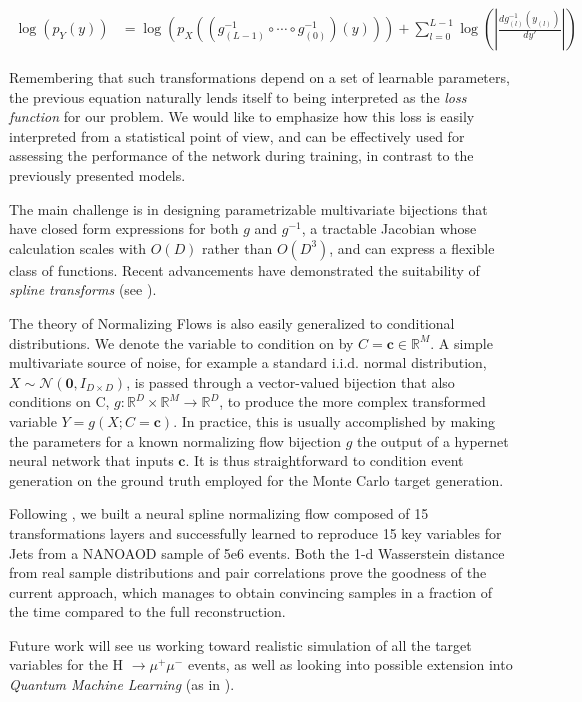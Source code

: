 \documentclass{scrartcl} %
\begin{document}
	\begin{equation*}
		\begin{aligned}
			\log(p_Y(y)) &= \log\left(p_X\left(\left(g_{(L-1)}^{-1}\circ\cdots\circ g_{(0)}^{-1}\right)\left(y\right)\right)\right)+\sum^{L-1}_{l=0}\log\left(\left|\frac{dg^{-1}_{(l)}(y_{(l)})}{dy'}\right|\right)
		\end{aligned}
	\end{equation*}
	
	Remembering that such transformations depend on a set of learnable parameters, the previous equation naturally lends itself to being interpreted as the \emph{loss function} for our problem. We would like to emphasize how this loss is easily interpreted from a statistical point of view, and can be effectively used for assessing the performance of the network during training, in contrast to the previously presented models.
	
	The main challenge is in designing parametrizable multivariate bijections that have closed form expressions for both $g$ and $g^{-1}$, a tractable Jacobian whose calculation scales with $O(D)$ rather than $O(D^3)$, and can express a flexible class of functions. Recent advancements have demonstrated the suitability of \emph{spline transforms} (see \cite{durkan}).
	
	The theory of Normalizing Flows is also easily generalized to conditional distributions. We denote the variable to condition on by $C=\mathbf{c}\in\mathbb{R}^M$. A simple multivariate source of noise, for example a standard i.i.d. normal distribution, $X\sim\mathcal{N}(\mathbf{0},I_{D\times D})$, is passed through a vector-valued bijection that also conditions on C, $g:\mathbb{R}^D\times\mathbb{R}^M\rightarrow\mathbb{R}^D$, to produce the more complex transformed variable $Y=g(X;C=\mathbf{c})$. In practice, this is usually accomplished by making the parameters for a known normalizing flow bijection $g$ the output of a hypernet neural network that inputs $\mathbf{c}$. It is thus straightforward to condition event generation on the ground truth employed for the Monte Carlo target generation.
	
	Following \cite{green2020complete}, we built a  neural spline normalizing flow composed of 15 transformations layers and successfully learned to reproduce 15 key variables for Jets from a NANOAOD sample of 5e6 events. Both the 1-d Wasserstein distance from real sample distributions and pair correlations prove the goodness of the current approach, which manages to obtain convincing samples in a fraction of the time compared to the full reconstruction.
	
	Future work will see us working toward realistic simulation of all the target variables for the  H $\xrightarrow{} \mu^+ \mu^-$ events, as well as looking into possible extension into \emph{Quantum Machine Learning} (as in \cite{chang2021quantum}).
	
	
	
\end{document}
